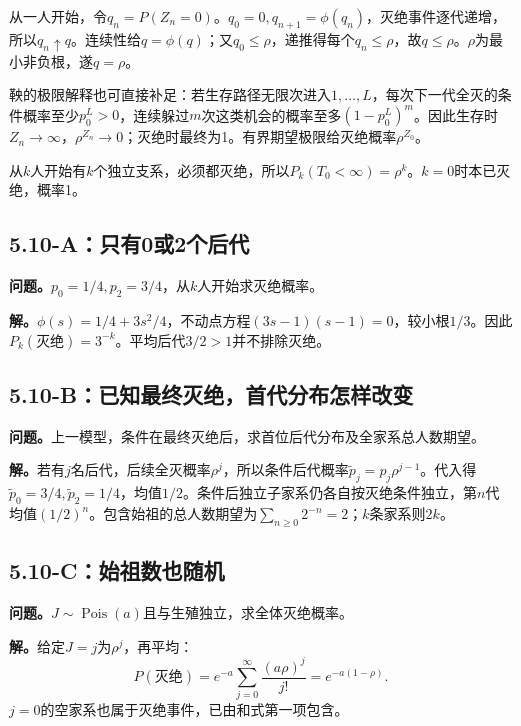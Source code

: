 \documentclass[11pt,a4paper,UTF8,fontset=fandol]{ctexart}
\begin{document}
从一人开始，令\(q_n=P(Z_n=0)\)。\(q_0=0,q_{n+1}=\phi(q_n)\)，灭绝事件逐代递增，所以\(q_n\uparrow q\)。连续性给\(q=\phi(q)\)；又\(q_0\le\rho\)，递推得每个\(q_n\le\rho\)，故\(q\le\rho\)。\(\rho\)为最小非负根，遂\(q=\rho\)。

鞅的极限解释也可直接补足：若生存路径无限次进入\(1,\ldots,L\)，每次下一代全灭的条件概率至少\(p_0^L>0\)，连续躲过\(m\)次这类机会的概率至多\((1-p_0^L)^m\)。因此生存时\(Z_n\to\infty\)，\(\rho^{Z_n}\to0\)；灭绝时最终为1。有界期望极限给灭绝概率\(\rho^{Z_0}\)。

从\(k\)人开始有\(k\)个独立支系，必须都灭绝，所以\(\boxed{P_k(T_0<\infty)=\rho^k}\)。\(k=0\)时本已灭绝，概率1。

\subsection{5.10-A：只有0或2个后代}\label{aux53eaux67090ux62162ux4e2aux540eux4ee3}

\textbf{问题。}\(p_0=1/4,p_2=3/4\)，从\(k\)人开始求灭绝概率。

\textbf{解。}\(\phi(s)=1/4+3s^2/4\)，不动点方程\((3s-1)(s-1)=0\)，较小根\(1/3\)。因此\(\boxed{P_k(\text{灭绝})=3^{-k}}\)。平均后代\(3/2>1\)并不排除灭绝。

\subsection{5.10-B：已知最终灭绝，首代分布怎样改变}\label{bux5df2ux77e5ux6700ux7ec8ux706dux7eddux9996ux4ee3ux5206ux5e03ux600eux6837ux6539ux53d8}

\textbf{问题。}上一模型，条件在最终灭绝后，求首位后代分布及全家系总人数期望。

\textbf{解。}若有\(j\)名后代，后续全灭概率\(\rho^j\)，所以条件后代概率\(\widetilde p_j=p_j\rho^{j-1}\)。代入得\(\widetilde p_0=3/4,\widetilde p_2=1/4\)，均值\(1/2\)。条件后独立子家系仍各自按灭绝条件独立，第\(n\)代均值\((1/2)^n\)。包含始祖的总人数期望为\(\sum_{n\ge0}2^{-n}=\boxed2\)；\(k\)条家系则\(2k\)。

\subsection{5.10-C：始祖数也随机}\label{cux59cbux7956ux6570ux4e5fux968fux673a}

\textbf{问题。}\(J\sim\operatorname{Pois}(a)\)且与生殖独立，求全体灭绝概率。

\textbf{解。}给定\(J=j\)为\(\rho^j\)，再平均：
\[\boxed{P(\text{灭绝})=e^{-a}\sum_{j=0}^{\infty}\frac{(a\rho)^j}{j!}=e^{-a(1-\rho)}.}\]
\(j=0\)的空家系也属于灭绝事件，已由和式第一项包含。
\end{document}
